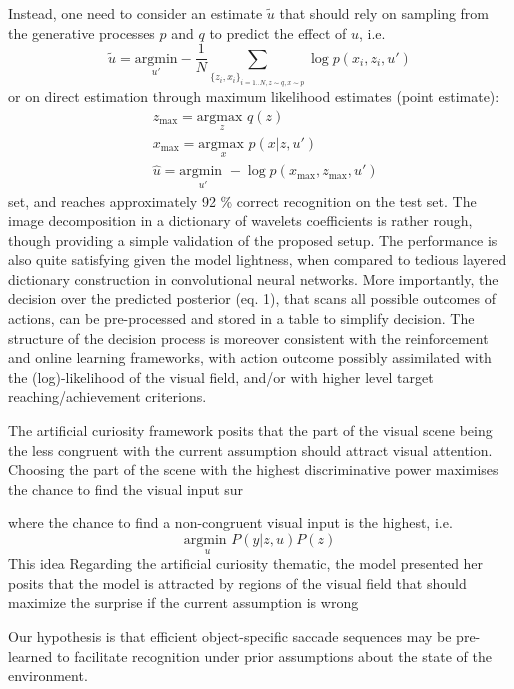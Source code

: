 \documentclass[12pt,twoside,openright]{article}
\begin{document}
	{\color{magenta} Instead, one need to consider an estimate $\tilde{u}$ that should rely on sampling from the generative processes $p$ and $q$ to 
		predict the effect of $u$,  i.e. 
		$$ \tilde{u} = \underset{u'}{\text{argmin}} - \frac{1}{N} \sum_{\{z_i, x_i\}_{i = 1..N, z \sim q, x \sim p}} \log p(x_i, z_i, u') $$ or on direct estimation through maximum likelihood estimates (point estimate):
		\begin{align*}
		&z_\text{max} = \underset{z}{\text{argmax }}q(z)\\
		&x_\text{max} = \underset{x}{\text{argmax }} p(x|z,u')\\
		&\hat{u} = \underset{u'}{\text{argmin }} - \log p(x_\text{max}, z_\text{max}, u')
		\end{align*}
	} set, and reaches approximately 92 \% correct recognition on the test set. The image decomposition in a dictionary of wavelets coefficients is rather rough, though providing a simple validation of the proposed setup. The performance is also quite satisfying given the model lightness, when compared to tedious layered dictionary construction in convolutional neural networks. 
	More importantly, the decision over the predicted posterior (eq. 1), that scans all possible outcomes of actions, can be pre-processed and stored in a table to simplify decision. The structure of the decision process is moreover consistent with the reinforcement and online learning frameworks, with action outcome possibly assimilated with the (log)-likelihood of the visual field, and/or with higher level target reaching/achievement criterions.
	
	{\color{magenta} The artificial curiosity framework posits that the part of the visual scene being the less congruent with the current assumption should attract visual attention. Choosing the part of the scene with the highest discriminative power maximises the chance to find the visual input sur
		
		where the chance to find a non-congruent visual input is the highest, i.e.
		$$ \underset{u}{\text{argmin }} P(y|z,u) P(z)$$
		This idea 
		Regarding the artificial curiosity thematic, the model presented her posits that the model is attracted by regions of the visual field that should maximize the surprise if the current assumption is wrong}
	
	{\color{magenta} Our hypothesis is that efficient object-specific saccade sequences may be pre-learned to facilitate recognition under prior assumptions about the state of the environment. }
		
\end{document}
